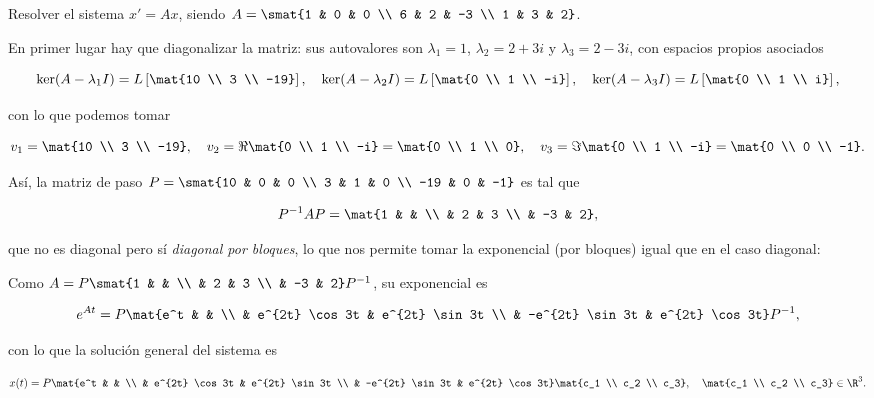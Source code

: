\documentclass[../main.tex]{subfiles}
\begin{document}
  \begin{example}
    Resolver el sistema \(x' = Ax\), siendo \(A = \smat{1 & 0 & 0 \\ 6 & 2 & -3 \\ 1 & 3 & 2}\).

    En primer lugar hay que diagonalizar la matriz: sus autovalores son
    \(\lambda_1 = 1\), \(\lambda_2 = 2+3i\) y \(\lambda_3 = 2-3i\), con espacios
    propios asociados

    \[\ker(A-\lambda_1 I) = L \left[ \mat{10 \\ 3 \\ -19} \right], \quad
      \ker(A-\lambda_2 I) = L \left[ \mat{0 \\ 1 \\ -i} \right], \quad
      \ker(A-\lambda_3 I) = L \left[\mat{0 \\ 1 \\ i} \right],\]

      con lo que podemos tomar

      \[v_1 = \mat{10 \\ 3 \\ -19}, \quad v_2 = \Re \mat{0 \\ 1 \\ -i} = \mat{0
          \\ 1 \\ 0}, \quad v_3 = \Im \mat{0 \\ 1 \\ -i} = \mat{0 \\ 0 \\ -1}.\]

      Así, la matriz de paso \(P = \smat{10 & 0 & 0 \\ 3 & 1 & 0 \\ -19 & 0 &
        -1}\) es tal que

      \[P^{-1}AP = \mat{1 & & \\ & 2 & 3 \\ & -3 & 2},\]

      que no es diagonal pero sí \emph{diagonal por bloques}, lo que nos permite
      tomar la exponencial (por bloques) igual que en el caso diagonal:

      Como \(A = P \smat{1 & & \\ & 2 & 3 \\ & -3 & 2} P^{-1}\), su exponencial es

      \[e^{At} = P \mat{e^t & & \\ & e^{2t} \cos 3t & e^{2t} \sin 3t \\ &
          -e^{2t} \sin 3t & e^{2t} \cos 3t} P^{-1},\]

      con lo que la solución general del sistema es

      \[x(t) = P \mat{e^t & & \\ & e^{2t} \cos 3t & e^{2t} \sin 3t \\ &
          -e^{2t} \sin 3t & e^{2t} \cos 3t} \mat{c_1 \\ c_2 \\ c_3}, \quad
        \mat{c_1 \\ c_2 \\ c_3} \in \R^3.\]
  \end{example}
  
\end{document}
